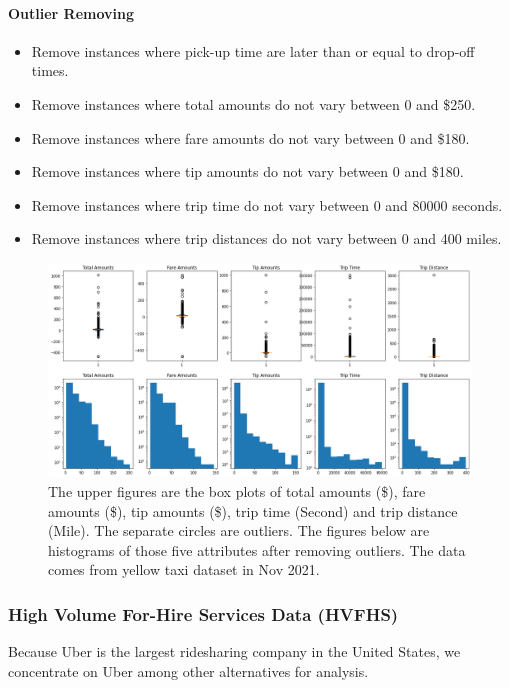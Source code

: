 \documentclass[11pt]{article}
\begin{document}
\paragraph{Outlier Removing}
\begin{itemize}
    \item Remove instances where pick-up time are later than or equal to drop-off times.
    \item Remove instances where total amounts do not vary between 0 and \$250.
    \item Remove instances where fare amounts do not vary between 0 and \$180.
    \item Remove instances where tip amounts do not vary between 0 and \$180.
    \item Remove instances where trip time do not vary between 0 and 80000 seconds.
    \item Remove instances where trip distances do not vary between 0 and 400 miles.
\end{itemize}

\begin{figure}
    \centering
    \includegraphics[scale = 0.38]{explore_yellow.png}
    \caption{The upper figures are the box plots of total amounts (\$), fare amounts (\$), tip amounts (\$), trip time (Second) and trip distance (Mile). The separate circles are outliers. The figures below are histograms of those five attributes after removing outliers. The data comes from yellow taxi dataset in Nov 2021.}
    \label{fig:explore_yellow}
\end{figure}

\subsubsection{High Volume For-Hire Services Data (HVFHS)}
Because Uber is the largest ridesharing company in the United States, we concentrate on Uber among other alternatives for analysis. 
\end{document}
